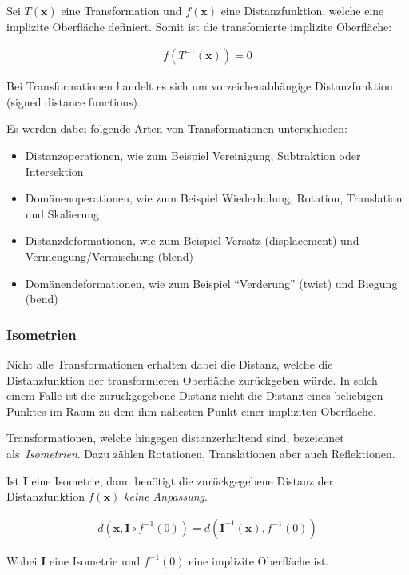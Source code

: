 Sei $T(\bm{x})$ eine Transformation und $f(\bm{x})$ eine Distanzfunktion,
welche eine implizite Oberfläche definiert. Somit ist die transfomierte
implizite Oberfläche:

\begin{gather}
    f(T^{-1}(\bm{x})) = 0
\end{gather}

Bei Transformationen handelt es sich um vorzeichenabhängige Distanzfunktion
(signed distance functions).

Es werden dabei folgende Arten von Transformationen unterschieden:
\begin{itemize}
    \item Distanzoperationen, wie zum Beispiel Vereinigung, Subtraktion oder Intersektion
    \item Domänenoperationen, wie zum Beispiel Wiederholung, Rotation, Translation und Skalierung
    \item Distanzdeformationen, wie zum Beispiel Versatz (displacement) und Vermengung/Vermischung (blend)
    \item Domänendeformationen, wie zum Beispiel ``Verderung'' (twist) und Biegung (bend)
\end{itemize}

\subsubsection{Isometrien}
\label{ssubsec:implicit_surfaces_ops_isometries}

Nicht alle Transformationen erhalten dabei die Distanz, welche die
Distanzfunktion der transformieren Oberfläche zurückgeben würde. In solch einem
Falle ist die zurückgegebene Distanz nicht die Distanz eines beliebigen Punktes
im Raum zu dem ihm nähesten Punkt einer impliziten Oberfläche.

Transformationen, welche hingegen distanzerhaltend sind,
bezeichnet~\cite{hart_sphere_1994} als~\textit{Isometrien}. Dazu zählen
Rotationen, Translationen aber auch Reflektionen.

Ist $\bm{I}$ eine Isometrie, dann benötigt die zurückgegebene Distanz der
Distanzfunktion $f(\bm{x})$ \textit{keine Anpassung}.

\begin{gather}
    d(\bm{x}, \bm{I} \circ f^{-1}(0)) = d(\bm{I}^{-1}(\bm{x}), f^{-1}(0))
\end{gather}

Wobei $\bm{I}$ eine Isometrie und $f^{-1}(0)$ eine implizite Oberfläche ist.


